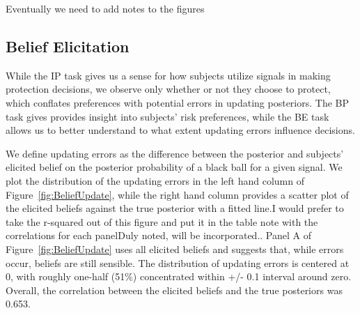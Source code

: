\documentclass[12pt,a4paper]{article}
\newcommand{\aut}[1]{{\color{Red}#1}}
\newcommand{\pmt}[1]{{\color{Blue}#1}}
\begin{document}
\pmt{Eventually we need to add notes to the figures}

\subsection{Belief Elicitation}
While the IP task gives us a sense for how subjects utilize signals in making protection decisions, we observe only whether or not they choose to protect, which conflates preferences with potential errors in updating posteriors.  The BP task gives provides insight into subjects' risk preferences, while the BE task allows us to better understand to what extent updating errors influence decisions.  

We define updating errors as the difference between the posterior and subjects’ elicited belief on the posterior probability of a black ball for a given signal.  We plot the distribution of the updating errors in the left hand column of Figure~\ref{fig:BeliefUpdate}, while the right hand column provides a scatter plot of the elicited beliefs against the true posterior with a fitted line.\pmt{I would prefer to take the r-squared out of this figure and put it in the table note with the correlations for each panel}\aut{Duly noted, will be incorporated.}.
Panel A of Figure~\ref{fig:BeliefUpdate} uses all elicited beliefs and suggests that, while errors occur, beliefs are still sensible. The distribution of updating errors is centered at 0, with roughly one-half (51\%) concentrated within +/- 0.1 interval around zero. Overall, the correlation between the elicited beliefs and the true posteriors was 0.653.  
\end{document}
